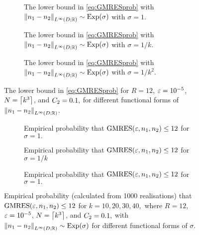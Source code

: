 \begin{figure}[p]
  \centering
  \begin{subfigure}{\textwidth}
    \centering

\caption{The lower bound in \cref{eq:GMRESprob} with $\NLiDRR{\no-\nt} \sim \Exp{\sigma}$ with $\sigma = 1.$\label{fig:prob-theory-plot-0.0}}
\end{subfigure}

\begin{subfigure}{\textwidth}
    \centering

\caption{The lower bound in \cref{eq:GMRESprob} with $\NLiDRR{\no-\nt} \sim \Exp{\sigma}$ with $\sigma = 1/k.$\label{fig:prob-theory-plot-1.0}}
\end{subfigure}

\begin{subfigure}{\textwidth}
    \centering
    
    \caption{The lower bound in \cref{eq:GMRESprob} with $\NLiDRR{\no-\nt} \sim \Exp{\sigma}$ with $\sigma = 1/k^2.$\label{fig:prob-theory-plot-2.0}}
\end{subfigure}
\caption{The lower bound in \cref{eq:GMRESprob} for $R=12$, $\varepsilon = 10^{-5}$, $N = \ceil{k^{3}}$, and $C_{2}=0.1,$ for different functional forms of $\NLiDRR{\no-\nt}$.}
\end{figure}
\begin{figure}[p]
  \centering
  \begin{subfigure}{\textwidth}
    \centering

\caption{Empirical probability that $\GMRES{\eps}{\no}{\nt}\leq 12$ for $\sigma = 1.$\label{fig:prob-plot-0.0}}
\end{subfigure}

\begin{subfigure}{\textwidth}
    \centering

\caption{Empirical probability that $\GMRES{\eps}{\no}{\nt}\leq 12$ for $\sigma = 1/k$\label{fig:prob-plot-1.0}}
\end{subfigure}

\begin{subfigure}{\textwidth}
    \centering

\caption{Empirical probability that $\GMRES{\eps}{\no}{\nt}\leq 12$ for $\sigma = 1.$\label{fig:prob-plot-2.0}}
\end{subfigure}
\caption{Empirical probability (calculated from 1000 realisations) that $\GMRES{\eps}{\no}{\nt}\leq 12$ for $k = 10, 20, 30, 40,$ where $R=12$, $\varepsilon = 10^{-5}$, $N = \ceil{k^{3}}$, and $C_{2}=0.1,$ with $\NLiDRR{\no-\nt} \sim \Exp{\sigma}$ for different functional forms of $\sigma.$}
\end{figure}


